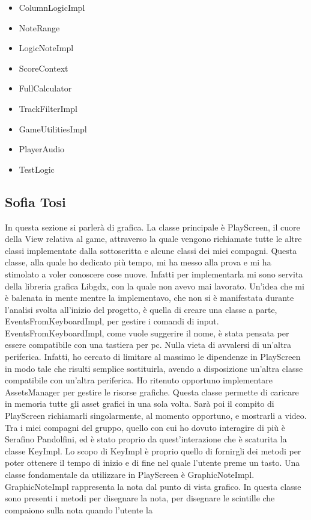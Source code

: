 \documentclass[a4paper,12pt]{report}
\begin{document}
{
	\begin{itemize}
		\item ColumnLogicImpl
		\item NoteRange
		\item LogicNoteImpl
		\item ScoreContext
		\item FullCalculator
		\item TrackFilterImpl
		\item GameUtilitiesImpl
		\item PlayerAudio
		\item TestLogic
	\end{itemize}
\newpage

\subsection{Sofia Tosi}
In questa sezione si parlerà di grafica. La classe principale è PlayScreen, il cuore della View relativa al game, attraverso la
quale vengono richiamate tutte le altre classi implementate dalla sottoscritta e alcune classi dei miei compagni. 
Questa classe, alla quale ho dedicato più tempo, mi ha messo alla prova e mi ha stimolato a voler conoscere cose nuove. Infatti per implementarla
mi sono servita della libreria grafica Libgdx, con la quale non avevo mai lavorato. Un'idea che mi è balenata in mente mentre la implementavo, che non si è 
manifestata durante l'analisi svolta all'inizio del progetto, è quella di creare una classe a parte, EventsFromKeyboardImpl, 
per gestire i comandi di input. EventsFromKeyboardImpl, come vuole suggerire il nome, è stata pensata per essere compatibile con una tastiera per pc. 
Nulla vieta di avvalersi di un'altra periferica. Infatti, ho cercato di limitare al massimo le dipendenze in PlayScreen in modo tale che risulti semplice sostituirla, 
avendo a disposizione un'altra classe compatibile con un'altra periferica.
Ho ritenuto opportuno implementare AssetsManager per gestire le risorse grafiche. Questa classe permette di caricare in memoria tutte gli asset grafici in una
sola volta. Sarà poi il compito di PlayScreen richiamarli singolarmente, al momento opportuno, e mostrarli a video.
Tra i miei compagni del gruppo, quello con cui ho dovuto interagire di più è Serafino Pandolfini, ed è stato proprio da quest'interazione che è scaturita la classe
KeyImpl. Lo scopo di KeyImpl è proprio quello di fornirgli dei metodi per poter ottenere il tempo di inizio e di fine nel quale l'utente preme un tasto.
Una classe fondamentale da utilizzare in PlayScreen è GraphicNoteImpl. GraphicNoteImpl rappresenta la nota dal punto di vista grafico. In questa classe sono presenti i metodi per disegnare la nota, per disegnare le scintille che compaiono sulla nota quando l'utente la
}
\end{document}
